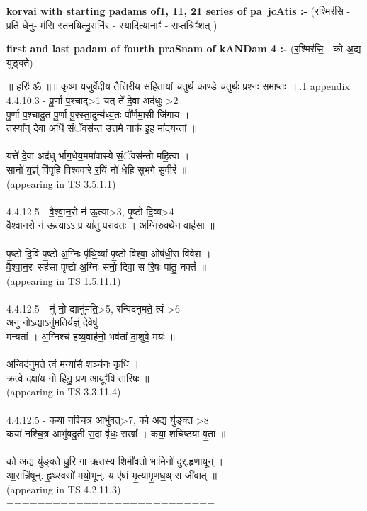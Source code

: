\documentclass[17pt]{extarticle}
\begin{document}
\textbf{korvai with starting padams of1, 11, 21 series of pa~jcAtis :-} \newline
(र॒श्मिर॑सि॒ - प्रति॑ धे॒नु- म॑सि स्तनयित्नु॒सनि॑र - स्यादि॒त्यानाꣳ॑ - स॒प्तत्रिꣳ॑शत् ) \newline

\textbf{first and last padam of fourth praSnam of kANDam 4 :-} \newline
(र॒श्मिर॑सि॒ - को अ॒द्य यु॑ङ्क्ते) \newline 


॥ हरिः॑ ॐ ॥॥ कृष्ण यजुर्वेदीय तैत्तिरीय संहितायां चतुर्थ काण्डे चतुर्थः प्रश्नः समाप्तः ॥ \newline
{}.1   appendix\\4.4.10.3 - पू॒र्णा प॒श्चाद्>1 यत् ते॑ दे॒वा अद॑धुः >2\\पू॒र्णा प॒श्चादु॒त पू॒र्णा पु॒रस्ता॒दुन्म॑ध्य॒तः पौ᳚र्णमा॒सी जि॑गाय । \\तस्या᳚न् दे॒वा अधि॑ सं॒ॅवस॑न्त उत्त॒मे नाक॑ इ॒ह मा॑दयन्तां ॥\\\\यत्ते॑ दे॒वा अद॑धु र्भाग॒धेय॒ममा॑वास्ये सं॒ॅवस॑न्तो महि॒त्वा । \\सानो॑ य॒ज्ञ्ं पि॑पृहि विश्ववारे र॒यिं नो॑ धेहि सुभगे सु॒वीरं᳚ ॥\\(appearing in TS 3.5.1.1)\\\\4.4.12.5 - वै॒श्वा॒न॒रो न॑ ऊ॒त्या>3, पृ॒ष्टो दि॒व्य>4\\वै॒श्वा॒न॒रो न॑ ऊ॒त्याऽऽ प्र या॑तु परा॒वतः॑ । अ॒ग्निरु॒क्थेन॒ वाह॑सा ॥\\\\पृ॒ष्टो दि॒वि पृ॒ष्टो अ॒ग्निः पृ॑थि॒व्यां पृ॒ष्टो विश्वा॒ ओष॑धी॒रा वि॑वेश । \\वै॒श्वा॒न॒रः सह॑सा पृ॒ष्टो अ॒ग्निः सनो॒ दिवा॒ स रि॒षः पा॑तु॒ नक्तं᳚ ॥\\(appearing in TS 1.5.11.1)\\\\4.4.12.5 - नु॑ नो॒ द्यानु॑मति॒>5, रन्विद॑नुमते॒ त्वं >6\\अनु॑ नो॒ऽद्याऽनु॑मतिर्य॒ज्ञ्ं दे॒वेषु॑ \\मन्यतां । अ॒ग्निश्च॑ हव्य॒वाह॑नो॒ भव॑तां दा॒शुषे॒ मयः॑ ॥ \\\\अन्विद॑नुमते॒ त्वं मन्या॑सै॒ शञ्च॑नः कृधि । \\क्रत्वे॒ दक्षा॑य नो हिनु॒ प्रण॒ आयूꣳ॑षि तारिषः ॥ \\(appearing in TS 3.3.11.4)\\\\4.4.12.5 - कया॑ नश्चि॒त्र आभु॑व॒त्>7, को अ॒द्य यु॑ङ्क्त >8\\कया॑ नश्चि॒त्र आभु॑वदू॒ती स॒दा वृ॑धः॒ सखा᳚ । कया॒ शचि॑ष्ठया वृ॒ता ॥ \\\\को अ॒द्य यु॑ङ्क्ते धु॒रि गा ऋ॒तस्य॒ शिमी॑वतो भा॒मिनो॑ दुर्.हृणा॒यून् । \\आ॒सन्नि॑षून्. हृ॒थ्स्वसो॑ मयो॒भून्. य ए॑षां भृ॒त्यामृ॒णध॒थ् स जी॑वात् ॥ \\(appearing in TS 4.2.11.3)\\===========================\\
\pagebreak
        
\end{document}
